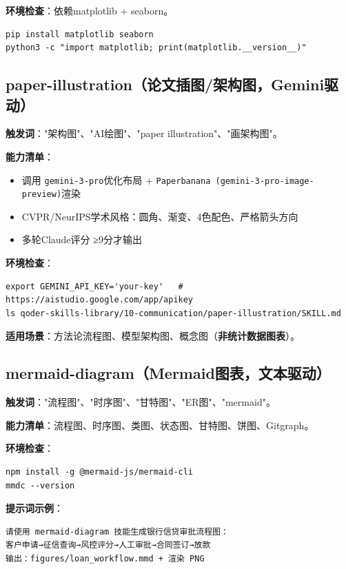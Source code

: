 \textbf{环境检查}：依赖matplotlib + seaborn。
\begin{lstlisting}[style=shell]
pip install matplotlib seaborn
python3 -c "import matplotlib; print(matplotlib.__version__)"
\end{lstlisting}

\subsection{paper-illustration（论文插图/架构图，Gemini驱动）}
\textbf{触发词}："架构图"、"AI绘图"、"paper illustration"、"画架构图"。

\textbf{能力清单}：
\begin{itemize}[leftmargin=1em]
  \item 调用 \texttt{gemini-3-pro}优化布局 + \texttt{Paperbanana (gemini-3-pro-image-preview)}渲染
  \item CVPR/NeurIPS学术风格：圆角、渐变、4色配色、严格箭头方向
  \item 多轮Claude评分 ≥9分才输出
\end{itemize}

\textbf{环境检查}：
\begin{lstlisting}[style=shell]
export GEMINI_API_KEY='your-key'   # https://aistudio.google.com/app/apikey
ls qoder-skills-library/10-communication/paper-illustration/SKILL.md
\end{lstlisting}

\textbf{适用场景}：方法论流程图、模型架构图、概念图（\textbf{非统计数据图表}）。

\subsection{mermaid-diagram（Mermaid图表，文本驱动）}
\textbf{触发词}："流程图"、"时序图"、"甘特图"、"ER图"、"mermaid"。

\textbf{能力清单}：流程图、时序图、类图、状态图、甘特图、饼图、Gitgraph。

\textbf{环境检查}：
\begin{lstlisting}[style=shell]
npm install -g @mermaid-js/mermaid-cli
mmdc --version
\end{lstlisting}

\textbf{提示词示例}：
\begin{lstlisting}
请使用 mermaid-diagram 技能生成银行信贷审批流程图：
客户申请→征信查询→风控评分→人工审批→合同签订→放款
输出：figures/loan_workflow.mmd + 渲染 PNG
\end{lstlisting}

